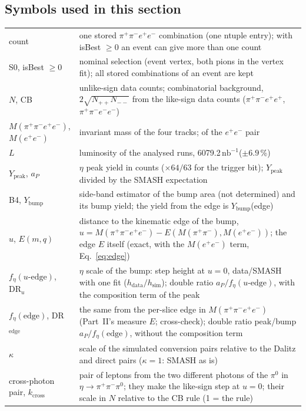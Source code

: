 \documentclass[11pt,a4paper]{article}
\renewcommand{\arraystretch}{1.15}
\newcommand{\piz}{\ensuremath{\pi^{0}}\xspace}
\newcommand{\ee}{\ensuremath{e^{+}e^{-}}\xspace}
\newcommand{\pipi}{\ensuremath{\pi^{+}\pi^{-}}\xspace}
\newcommand{\ppee}{\ensuremath{\pi^{+}\pi^{-}e^{+}e^{-}}\xspace}
\newcommand{\Mfour}{\ensuremath{M(\pi^{+}\pi^{-}e^{+}e^{-})}\xspace}
\newcommand{\Mee}{\ensuremath{M(e^{+}e^{-})}\xspace}
\newcommand{\Mpipi}{\ensuremath{M(\pi^{+}\pi^{-})}\xspace}
\newcommand{\nbinv}{\ensuremath{\mathrm{nb}^{-1}}\xspace}
\newcommand{\aP}{\ensuremath{a_P}\xspace}
\newcommand{\Ybump}{\ensuremath{Y_{\mathrm{bump}}}\xspace}
\newcommand{\Ypeak}{\ensuremath{Y_{\mathrm{peak}}}\xspace}
\begin{document}
\subsection{Symbols used in this section}
\label{sec:symbols1}
{\footnotesize
\renewcommand{\arraystretch}{1.0}
\begin{longtable}{@{}>{\raggedright\arraybackslash}p{3.3cm} >{\raggedright\arraybackslash}p{\dimexpr\textwidth-3.3cm-2\tabcolsep\relax}@{}}
\toprule
count & one stored \ppee combination (one ntuple entry); with isBest $\ge0$ an event can give more than one count \\
S0, isBest $\ge0$ & nominal selection (event vertex, both pions in the vertex fit); all stored combinations of an event are kept \\
$N$, CB & unlike-sign data counts; combinatorial background, $2\sqrt{N_{++}N_{--}}$ from the like-sign data counts ($\pipi e^+e^+$, $\pipi e^-e^-$) \\
\Mfour, \Mee & invariant mass of the four tracks; of the \ee pair \\
$L$ & luminosity of the analysed runs, 6079.2\,\nbinv ($\pm6.9$\,\%) \\
\Ypeak, \aP & $\eta$ peak yield in counts ($\times64/63$ for the trigger bit); \Ypeak divided by the SMASH expectation \\
B4, \Ybump & side-band estimator of the bump area (not determined) and its bump yield; the yield from the edge is \Ybump(edge) \\
$u$, $E(m,q)$ & distance to the kinematic edge of the bump, $u=\Mfour-E(\Mpipi,\Mee)$; the edge $E$ itself (exact, with the \Mee term,
Eq.~\ref{eq:edge}) \\
$f_\eta(u\text{-edge})$, DR$_u$ & $\eta$ scale of the bump: step height at $u=0$, data/SMASH with one fit ($h_{\mathrm{data}}/h_{\mathrm{sim}}$);
double ratio $\aP/f_\eta(u\text{-edge})$, with the composition term of the peak \\
$f_\eta(\mathrm{edge})$, DR$_{\mathrm{edge}}$ & the same from the per-slice edge in \Mfour (Part~II's measure $E$; cross-check); double ratio
peak/bump $\aP/f_\eta(\mathrm{edge})$, without the composition term \\
$\kappa$ & scale of the simulated conversion pairs relative to the Dalitz and direct pairs ($\kappa=1$: SMASH as is) \\
cross-photon pair, $k_{\mathrm{cross}}$ & pair of leptons from the two different photons of the \piz in $\eta\to\pipi\piz$; they make the
like-sign step at $u=0$; their scale in $N$ relative to the CB rule (1 = the rule) \\

\end{longtable}}
\end{document}
